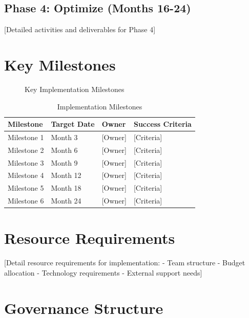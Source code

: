 \documentclass[11pt,letterpaper]{report}
\begin{document}
\subsection{Phase 4: Optimize (Months 16-24)}
[Detailed activities and deliverables for Phase 4]

\section{Key Milestones}


\begin{figure}[htbp]
\centering
\caption{Key Implementation Milestones}
\label{fig:milestones}
\end{figure}

\begin{table}[htbp]
\centering
\caption{Implementation Milestones}
\begin{tabular}{@{}llll@{}}
\toprule
\textbf{Milestone} & \textbf{Target Date} & \textbf{Owner} & \textbf{Success Criteria} \\
\midrule
Milestone 1 & Month 3 & [Owner] & [Criteria] \\
\rowcolor{tablealt} Milestone 2 & Month 6 & [Owner] & [Criteria] \\
Milestone 3 & Month 9 & [Owner] & [Criteria] \\
\rowcolor{tablealt} Milestone 4 & Month 12 & [Owner] & [Criteria] \\
Milestone 5 & Month 18 & [Owner] & [Criteria] \\
\rowcolor{tablealt} Milestone 6 & Month 24 & [Owner] & [Criteria] \\
\bottomrule
\end{tabular}
\label{tab:milestones}
\end{table}

\section{Resource Requirements}

[Detail resource requirements for implementation:
- Team structure
- Budget allocation
- Technology requirements
- External support needs]

\section{Governance Structure}
\end{document}
